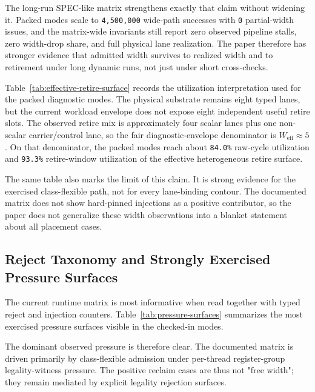 \documentclass[twocolumn]{article}
\begin{document}
The long-run SPEC-like matrix strengthens exactly that claim without widening it. Packed modes scale to \texttt{4,500,000} wide-path successes with \texttt{0} partial-width issues, and the matrix-wide invariants still report zero observed pipeline stalls, zero width-drop share, and full physical lane realization. The paper therefore has stronger evidence that admitted width survives to realized width and to retirement under long dynamic runs, not just under short cross-checks.

Table~\ref{tab:effective-retire-surface} records the utilization interpretation used for the packed diagnostic modes. The physical substrate remains eight typed lanes, but the current workload envelope does not expose eight independent useful retire slots. The observed retire mix is approximately four scalar lanes plus one non-scalar carrier/control lane, so the fair diagnostic-envelope denominator is \(W_{\mathrm{eff}}\approx5\). On that denominator, the packed modes reach about \texttt{84.0\%} raw-cycle utilization and \texttt{93.3\%} retire-window utilization of the effective heterogeneous retire surface.



The same table also marks the limit of this claim. It is strong evidence for the exercised class-flexible path, not for every lane-binding contour. The documented matrix does not show hard-pinned injections as a positive contributor, so the paper does not generalize these width observations into a blanket statement about all placement cases.


\subsection{Reject Taxonomy and Strongly Exercised Pressure Surfaces}

The current runtime matrix is most informative when read together with typed reject and injection counters. Table~\ref{tab:pressure-surfaces} summarizes the most exercised pressure surfaces visible in the checked-in modes.



The dominant observed pressure is therefore clear. The documented matrix is driven primarily by class-flexible admission under per-thread register-group legality-witness pressure. The positive reclaim cases are thus not "free width"; they remain mediated by explicit legality rejection surfaces.
\end{document}
